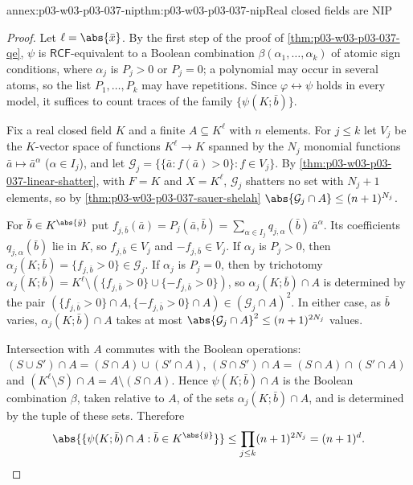 \begin{annexitem}{annex:p03-w03-p03-037-nip}{thm:p03-w03-p03-037-nip}{Real closed fields are NIP}
\begin{proof}
Let \(\ell=\abs{\bar x}\).  By the first step of the proof of
\cref{thm:p03-w03-p03-037-qe}, \(\psi\) is \(\mathsf{RCF}\)-equivalent to a
Boolean combination \(\beta(\alpha_1,\dots,\alpha_k)\) of atomic sign
conditions, where \(\alpha_j\) is \(P_j>0\) or \(P_j=0\); a polynomial may
occur in several atoms, so the list \(P_1,\dots,P_k\) may have repetitions.
Since \(\varphi\leftrightarrow\psi\) holds in every model, it suffices to
count traces of the family \(\{\psi(K;\bar b)\}\).

Fix a real closed field \(K\) and a finite \(A\subseteq K^\ell\) with \(n\)
elements.  For \(j\leq k\) let \(V_j\) be the \(K\)-vector space of functions
\(K^\ell\to K\) spanned by the \(N_j\) monomial functions
\(\bar a\mapsto\bar a^{\alpha}\) (\(\alpha\in I_j\)), and let
\(\mathcal G_j=\{\{\bar a:f(\bar a)>0\}:f\in V_j\}\).  By
\cref{thm:p03-w03-p03-037-linear-shatter}, with \(F=K\) and \(X=K^\ell\),
\(\mathcal G_j\) shatters no set with \(N_j+1\) elements, so by
\cref{thm:p03-w03-p03-037-sauer-shelah}
\(\abs{\mathcal G_j\cap A}\leq(n+1)^{N_j}\).

For \(\bar b\in K^{\abs{\bar y}}\) put
\(f_{j,\bar b}(\bar a)=P_j(\bar a,\bar b)=
\sum_{\alpha\in I_j}q_{j,\alpha}(\bar b)\,\bar a^{\alpha}\).  Its coefficients
\(q_{j,\alpha}(\bar b)\) lie in \(K\), so \(f_{j,\bar b}\in V_j\) and
\(-f_{j,\bar b}\in V_j\).  If \(\alpha_j\) is \(P_j>0\), then
\(\alpha_j(K;\bar b)=\{f_{j,\bar b}>0\}\in\mathcal G_j\).  If \(\alpha_j\) is
\(P_j=0\), then by trichotomy
\(\alpha_j(K;\bar b)=K^\ell\setminus(\{f_{j,\bar b}>0\}\cup\{-f_{j,\bar b}>0\})\),
so \(\alpha_j(K;\bar b)\cap A\) is determined by the pair
\((\{f_{j,\bar b}>0\}\cap A,\{-f_{j,\bar b}>0\}\cap A)\in(\mathcal G_j\cap A)^2\).
In either case, as \(\bar b\) varies, \(\alpha_j(K;\bar b)\cap A\) takes at
most \(\abs{\mathcal G_j\cap A}^2\leq(n+1)^{2N_j}\) values.

Intersection with \(A\) commutes with the Boolean operations:
\((S\cup S')\cap A=(S\cap A)\cup(S'\cap A)\),
\((S\cap S')\cap A=(S\cap A)\cap(S'\cap A)\) and
\((K^\ell\setminus S)\cap A=A\setminus(S\cap A)\).  Hence
\(\psi(K;\bar b)\cap A\) is the Boolean combination \(\beta\), taken relative
to \(A\), of the sets \(\alpha_j(K;\bar b)\cap A\), and is determined by the
tuple of these sets.  Therefore
\[
\abs{\{\psi(K;\bar b)\cap A:\bar b\in K^{\abs{\bar y}}\}}\leq
\prod_{j\leq k}(n+1)^{2N_j}=(n+1)^{d}.
\]


\end{proof}
\end{annexitem}
